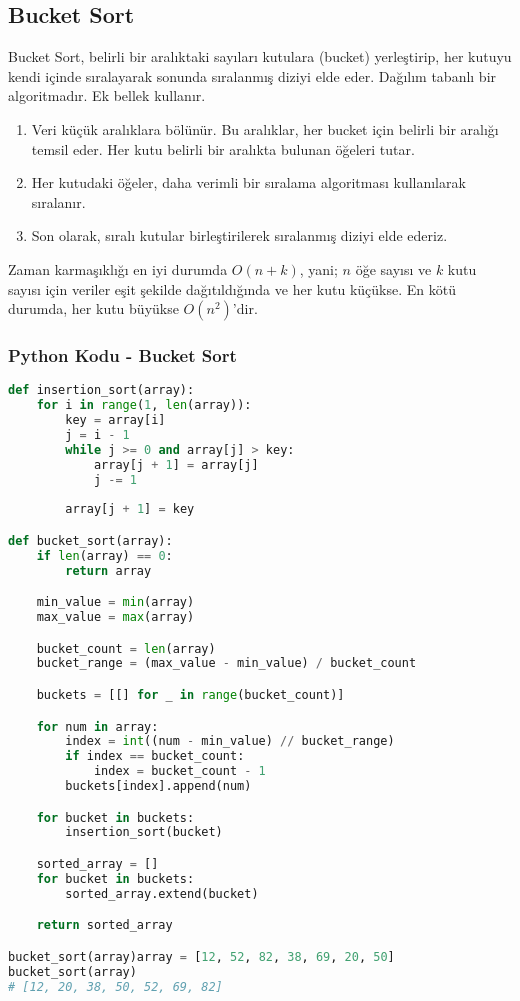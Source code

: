 \newpage

\subsection{Bucket Sort}

Bucket Sort, belirli bir aralıktaki sayıları kutulara (bucket) yerleştirip, her kutuyu kendi içinde sıralayarak sonunda sıralanmış diziyi elde eder. Dağılım tabanlı bir algoritmadır. Ek bellek kullanır.

\begin{enumerate}
    \item Veri küçük aralıklara bölünür. Bu aralıklar, her bucket için belirli bir aralığı temsil eder. Her kutu belirli bir aralıkta bulunan öğeleri tutar.
    \item Her kutudaki öğeler, daha verimli bir sıralama algoritması kullanılarak sıralanır.
    \item Son olarak, sıralı kutular birleştirilerek sıralanmış diziyi elde ederiz.
\end{enumerate}

Zaman karmaşıklığı en iyi durumda $O(n + k)$, yani; $n$ öğe sayısı ve $k$ kutu sayısı için veriler eşit şekilde dağıtıldığında ve her kutu küçükse. En kötü durumda, her kutu büyükse $O(n^2)$'dir.

\subsubsection{Python Kodu - Bucket Sort}

\begin{lstlisting}[language=Python]
def insertion_sort(array):
    for i in range(1, len(array)):
        key = array[i]
        j = i - 1
        while j >= 0 and array[j] > key:
            array[j + 1] = array[j]
            j -= 1
            
        array[j + 1] = key

def bucket_sort(array):
    if len(array) == 0:
        return array

    min_value = min(array)
    max_value = max(array)

    bucket_count = len(array)
    bucket_range = (max_value - min_value) / bucket_count

    buckets = [[] for _ in range(bucket_count)]

    for num in array:
        index = int((num - min_value) // bucket_range)
        if index == bucket_count:
            index = bucket_count - 1
        buckets[index].append(num)

    for bucket in buckets:
        insertion_sort(bucket)

    sorted_array = []
    for bucket in buckets:
        sorted_array.extend(bucket)

    return sorted_array

bucket_sort(array)array = [12, 52, 82, 38, 69, 20, 50]
bucket_sort(array)
# [12, 20, 38, 50, 52, 69, 82]
\end{lstlisting}

\newpage

\newpage